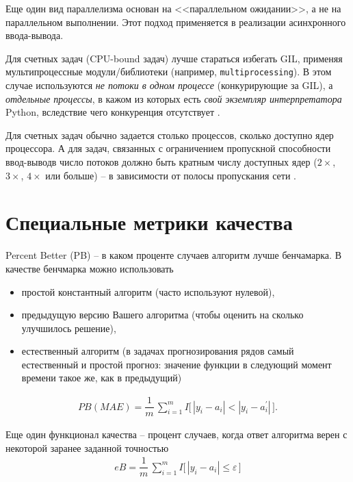 \documentclass[%
	11pt,
	a4paper,
	utf8,
		]{article}
\begin{document}
Еще один вид параллелизма основан на <<параллельном ожидании>>, а не на параллельном выполнении. Этот подход применяется в реализации асинхронного ввода-вывода.

Для счетных задач (CPU-bound задач) лучше стараться избегать GIL, применяя мультипроцессные модули/библиотеки (например, \texttt{multiprocessing}). В этом случае используются \emph{не потоки в одном процессе} (конкурирующие за GIL), а \emph{отдельные процессы}, в кажом из которых есть \emph{свой экземпляр интерпретатора} Python, вследствие чего конкуренция отсутствует \cite[]{summerfield:python_practice}.

Для счетных задач обычно задается столько процессов, сколько доступно ядер процессора. А для задач, связанных с ограничением пропускной способности ввод-выводв число потоков должно быть кратным числу доступных ядер ($ 2 \times $, $ 3 \times $, $ 4 \times $ или больше) -- в зависимости от полосы пропускания сети \cite[']{summerfield:python_practice}.



\section{Специальные метрики качества}

Percent Better (PB) -- в каком проценте случаев алгоритм лучше бенчамарка. В качестве бенчмарка можно использовать
\begin{itemize}
	\item простой константный алгоритм (часто используют нулевой),  
	
	\item предыдущую версию Вашего алгоритма (чтобы оценить на сколько улучшилось решение),
	
	\item естественный алгоритм (в задачах прогнозирования рядов самый естественный и простой прогноз: значение функции в следующий момент времени такое же, как в предыдущий)
\end{itemize}

\begin{align*}
	PB(MAE) = \dfrac{1}{m} \, \sum_{i=1}^{m} I \Big[ \, | y_i - a_i | < | y_i - a_i^{'} | \, \Big].
\end{align*}

Еще один функционал качества -- процент случаев, когда ответ алгоритма верен с некоторой заранее заданной точностью
\begin{align*}
	eB = \dfrac{1}{m} \, \sum_{i=1}^{m} I \Big[ \, | y_i - a_i | \leqslant \varepsilon \, \Big]
\end{align*}
\end{document}
